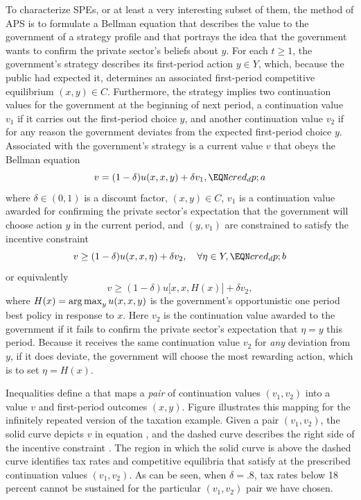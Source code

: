 To characterize  SPEs, or at least a very interesting subset of them,
the method of APS is to formulate a Bellman
equation that describes the value to the government of a strategy profile
and that portrays the idea that
the government wants to confirm the
private sector's beliefs about $y$.
 For each $t \geq 1$, the
government's strategy describes its
first-period action $y\in Y$, which,  because the public had expected
it,  determines
an associated first-period competitive equilibrium
$(x,y) \in C$. Furthermore,
the strategy implies two continuation values
 for the government at the beginning of next period,  a
continuation value $v_1$
 if it carries out the first-period choice $y$,
and another continuation value
$v_2$  if for any reason the government
deviates from the expected first-period choice
$y$.
Associated with the government's strategy is
a current value $v$ that obeys the Bellman equation %
$$ v = (1-\delta) u(x,x,y) + \delta v_1 ,\EQN cred_dp;a   $$
where $\delta \in (0,1)$ is a discount factor, $(x,y) \in C$, $v_1$ is a continuation value
awarded for confirming the private sector's expectation that the government will choose action $y$ in the current period,  and
 $(y,v_1)$  are constrained to satisfy
the incentive constraint
$$v \geq (1-\delta) u(x,x,\eta) +
 \delta v_2 , \quad
   \forall \eta \in Y, \EQN cred_dp;b  $$
or equivalently
$$v \geq (1-\delta) u\bigl[x,x,H(x)\bigr] +
 \delta v_2 ,$$
where  $H(x) = \mathop{\rm arg\,max}_y u(x,x,y)$ is the government's opportunistic one period best policy in response
to $x$.
Here $v_2$ is the continuation value awarded to the government if it fails to confirm
the private sector's expectation that $\eta = y$ this period.
Because it receives the same continuation
value $v_2$ for {\it any\/} deviation from $y$, if it
does deviate, the government  will  choose the most rewarding action, which
is to set $\eta = H(x)$.

  Inequalities  define a  that
maps a {\it pair\/} of continuation values $(v_1,v_2)$ into a value $v$ and
first-period outcomes $(x,y)$. %
Figure  illustrates this
mapping for the infinitely repeated version of the taxation
example. Given a pair $(v_1,v_2)$, the solid curve depicts $v$
in equation , and the dashed curve describes the right
side of the incentive constraint . The region in which
the solid
curve is above the dashed curve  identifies
tax rates and competitive equilibria that
satisfy
 at the prescribed continuation values $(v_1,v_2)$. As
can be seen, when $\delta =.8$,
 tax rates below 18 percent cannot be sustained
for the particular $(v_1, v_2)$ pair we have chosen.

